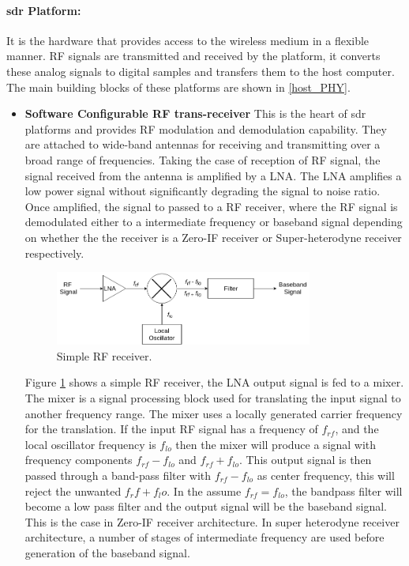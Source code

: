 \paragraph{\ac{sdr} Platform:} It is the hardware that provides access to the wireless medium in a flexible manner.
\ac{RF} signals are transmitted and received by the platform, it converts these analog signals to digital samples and transfers them to the host computer.
The main building blocks of these platforms are shown in \ref{host_PHY}.
\begin{itemize}
\item{\textbf{Software Configurable \ac{RF} trans-receiver}} This is the heart of \ac{sdr} platforms and provides \ac{RF} modulation and demodulation capability.
They are attached to wide-band antennas for receiving and transmitting over a broad range of frequencies.
Taking the case of reception of RF signal, the signal received from the antenna is amplified by a \ac{LNA}.
The \ac{LNA} amplifies a low power signal without significantly degrading the signal to noise ratio.
Once amplified, the signal to passed to a \ac{RF} receiver, where the \ac{RF} signal is demodulated either to a intermediate frequency or baseband signal depending on whether the the receiver is a Zero-IF receiver or Super-heterodyne receiver respectively.\\

\begin{figure}[h!]
\centering
\includegraphics[width=0.8\textwidth]{Figure/RF_receiver.png}
\caption{Simple \ac{RF} receiver.}
\label{rf_receiver}
\end{figure}

Figure \ref{rf_receiver} shows a simple \ac{RF} receiver, the \ac{LNA} output signal is fed to a mixer.
The mixer is a signal processing block used for translating the input signal to another frequency range.
The mixer uses a locally generated carrier frequency for the translation. 
If the input \ac{RF} signal has a frequency of $f_{rf}$, and the local oscillator frequency is $f_{lo}$ then the mixer will produce a signal with frequency components $f_{rf}-f_{lo}$ and $f_{rf}+f_{lo}$.
This output signal is then passed through a band-pass filter with $f_{rf}-f_{lo}$ as center frequency, this will reject the unwanted $f_rf+f_lo$.
In the assume $f_{rf}=f_{lo}$, the bandpass filter will become a low pass filter and the output signal will be the baseband signal.
This is the case in Zero-IF receiver architecture.
In super heterodyne receiver architecture, a number of stages of intermediate frequency are used before generation of the baseband signal.\\


\end{itemize}

